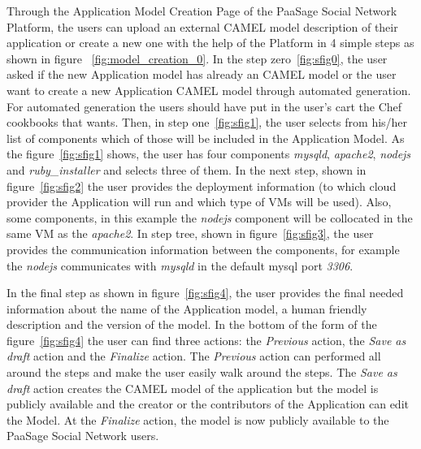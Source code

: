 Through the Application Model Creation Page of the PaaSage Social Network Platform, the users can upload an external CAMEL model description of their application or create a new one with the help of the Platform in 4 simple steps as shown in figure ~\ref{fig:model_creation_0}. In the step zero~\ref{fig:sfig0}, the user asked if the new Application model has already an CAMEL model or the user want to create a new Application CAMEL model through automated generation. For automated generation the users should have put in the user's cart the Chef cookbooks that wants. Then, in step one~\ref{fig:sfig1}, the user selects from his/her list of components which of those will be included in the Application Model. 
As the figure~\ref{fig:sfig1} shows, the user has four components {\it mysqld}, {\it apache2}, {\it nodejs} and 
{\it ruby\_installer} and selects three of them. In the next step, shown in figure~\ref{fig:sfig2} the user provides the deployment information (to which cloud provider the Application will run and which type of VMs will be used). Also, some components, in this example the {\it nodejs} component will be collocated in the same VM as the {\it apache2}. In step tree, shown in figure~\ref{fig:sfig3}, the user provides the communication information between the components, for example the 
{\it nodejs} communicates with {\it mysqld} in the default mysql port {\it 3306}.

In the final step as shown in figure~\ref{fig:sfig4}, the user provides the final needed information about the name of the Application model, a human friendly description and the version of the model. In the bottom of the form of the figure~\ref{fig:sfig4} the user can find three actions: the \emph{Previous} action, the \emph{Save as draft} action and the \emph{Finalize} action. The \emph{Previous} action can performed all around the steps and make the user easily walk around the steps. The \emph{Save as draft} action creates the CAMEL model of the application but the model is publicly available and the creator or the contributors of the Application can edit the Model. At the \emph{Finalize} action, the model is now publicly available to the PaaSage Social Network users.

